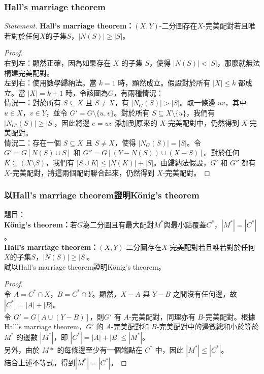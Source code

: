 \documentclass[a4paper,12pt]{report}
\begin{document}
\subsubsection{Hall's marriage theorem}
\textit{Statement. }\textbf{Hall's marriage theorem：}$(X, Y)$-二分圖存在$X$-完美配對若且唯若對於任何$X$的子集$S$，$|N(S)|\geq|S|$。
\begin{proof}\mbox{}\\
右到左：顯然正確，因為如果存在 $X$ 的子集 $S$，使得 $|N(S)| < |S|$，那麼就無法構建完美配對。 \\
左到右：使用數學歸納法。當 $k=1$ 時，顯然成立。假設對於所有 $|X|\leq k$ 都成立。當 $|X|=k+1$ 時，令該圖為$G$，有兩種情況： \\
情況一：對於所有 $S\subseteq X$ 且 $S\neq X$，有 $|N_G(S)| > |S|$。取一條邊 $uv$，其中 $u\in X$，$v\in Y$，並令 $G' = G \setminus\{u, v\}$。對於所有 $S\subseteq X\setminus\{u\}$，我們有 $|N_{G'}(S)| \geq |S|$，因此將邊 $e=uv$ 添加到原來的 $X$-完美配對中，仍然得到 $X$-完美配對。 \\
情況二：存在一個 $S\subseteq X$ 且 $S\neq X$，使得 $|N_G(S)| = |S|$。令 $G' = G[N(S)\cup S]$ 和 $G'' = G[(Y-N(S))\cup (X-S)]$。對於任何 $K\subseteq (X\setminus S)$，我們有 $|S\cup K| \leq |N(K)| + |S|$。由歸納法假設，$G'$ 和 $G''$ 都有 $X$-完美配對，將這兩個配對聯合起來，仍然得到 $X$-完美配對。
\end{proof}
\subsubsection{以Hall's marriage theorem證明König's theorem}
題目：\\
\textbf{König's theorem：}若$G$為二分圖且有最大配對$M^*$與最小點覆蓋$C^*$，$|M^*|=|C^*|$。 \\
\textbf{Hall's marriage theorem：}$(X, Y)$-二分圖存在$X$-完美配對若且唯若對於任何$X$的子集$S$，$|N(S)|\geq|S|$。 \\
試以Hall's marriage theorem證明König's theorem。
\begin{proof}\mbox{}\\
令 $A = C^* \cap X$，$B = C^* \cap Y$。顯然，$X - A$ 與 $Y - B$ 之間沒有任何邊，故$|C^*| = |A| + |B|$。 \\
令 $G' = G[A \cup (Y - B)]$，則$G'$ 有 $A$-完美配對，同理亦有 $B$-完美配對。根據 Hall's marriage theorem，$G'$ 的 $A$-完美配對和 $B$-完美配對中的邊數總和小於等於$M^*$ 的邊數 $|M^*|$，即 $|C^*| = |A| + |B| \leq |M^*|$。\\
另外，由於 $M*$ 的每條邊至少有一個端點在 $C^*$ 中，因此 $|M^*| \leq |C^*|$。 \\
結合上述不等式，得到$|M^*|=|C^*|$。
\end{proof}
\end{document}
